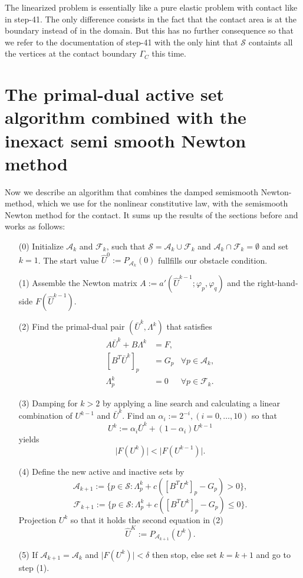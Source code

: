 \documentclass{article}
\begin{document}
The linearized problem is essentially like a pure elastic problem with contact like
in step-41. The only difference consists in the fact that the contact area
is at the boundary instead of in the domain. But this has no further consequence
so that we refer to the documentation of step-41 with the only hint that
$\mathcal{S}$ containts all the vertices at the contact boundary $\Gamma_C$ this
time.

\section{The primal-dual active set algorithm combined with the inexact semi smooth
Newton method}

Now we describe an algorithm that combines the damped semismooth Newton-method,
which we use for the nonlinear constitutive law, with the semismooth Newton
method for the contact. It sums up the results of the sections before and works as follows:
\begin{itemize}
 \item[(0)] Initialize $\mathcal{A}_k$ and $\mathcal{F}_k$, such that
 $\mathcal{S} = \mathcal{A}_k \cup \mathcal{F}_k$ and $\mathcal{A}_k \cap
 \mathcal{F}_k = \emptyset$ and set $k = 1$. The start value $\hat U^0 :=
 P_{\mathcal{A}_k}(0)$ fullfills our obstacle condition.
 \item[(1)] Assemble the Newton matrix $A := a'(\hat
 U^{k-1};\varphi_p,\varphi_q)$ and the right-hand-side $F(\hat U^{k-1})$.
 \item[(2)] Find the primal-dual pair $(\bar U^k,\Lambda^k)$ that satisfies
 \begin{align*}
 A\bar U^k + B\Lambda^k & = F, &\\
 \left[B^T\bar U^k\right]_p & = G_p & \forall p\in\mathcal{A}_k,\\
 \Lambda^k_p & = 0 & \forall p\in\mathcal{F}_k.
 \end{align*}
 \item[(3)] Damping for $k>2$ by applying a line search and calculating a linear
 combination of $U^{k-1}$ and $\bar U^k$. Find an
 $\alpha_i:=2^{-i},(i=0,\ldots,10)$ so that $$U^k := \alpha_i\bar U^k +
 (1-\alpha_i)U^{k-1}$$ yields $$\vert
 F\left(U^{k}\right) \vert < \vert F\left(U^{k-1}\right) \vert.$$
 \item[(4)] Define the new active and inactive sets by
 $$\mathcal{A}_{k+1}:=\lbrace p\in\mathcal{S}:\Lambda^k_p +
 c\left(\left[B^TU^k\right]_p - G_p\right) > 0\rbrace,$$
 $$\mathcal{F}_{k+1}:=\lbrace p\in\mathcal{S}:\Lambda^k_p +
 c\left(\left[B^TU^k\right]_p - G_p\right) \leq 0\rbrace.$$
 Projection $U^k$ so that it holds the second equation in (2)
 $$\hat U^K := P_{\mathcal{A}_{k+1}}(U^k).$$ 
 \item[(5)] If $\mathcal{A}_{k+1} = \mathcal{A}_k$ and $\vert
 F\left(U^{k}\right) \vert < \delta$ then stop, else set $k=k+1$ and go to
 step (1).
\end{itemize}
\end{document}
